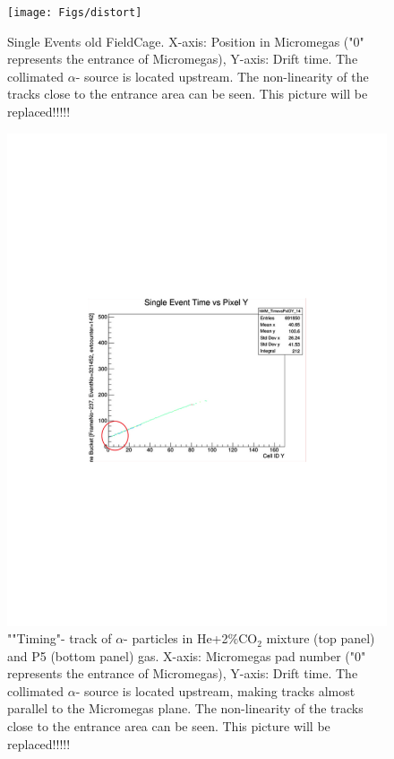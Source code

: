 \documentclass[final,number,sort&compress,5p,times,twocolumn]{elsarticle}
\begin{document}
\begin{figure}[hbt!]
    \centering
    \texttt{[image: Figs/distort]}
    \caption{Single Events old  FieldCage.   X-axis:  Position in Micromegas ("0" represents the entrance of Micromegas), Y-axis:  Drift time. The collimated $\alpha$- source is located upstream. 
    The non-linearity of the tracks close to the entrance area can be seen.    This picture will be replaced!!!!!}
      \label{fig:distort} 
\end{figure}

\begin{figure}[hbt!]
  \centering
\includegraphics[width=1.0\columnwidth]{Figs/tracks}
  \caption{""Timing"- track  of $\alpha$- particles in He+2$\%$CO$_2$ mixture (top panel) and P5 (bottom panel) gas. X-axis:  Micromegas pad number  ("0" represents the entrance of Micromegas), Y-axis:  Drift time. The collimated $\alpha$- source is located upstream, making tracks almost parallel to the Micromegas plane. The non-linearity of the tracks close to the entrance area can be seen.   This picture will be replaced!!!!! }
    \label{fig:tracks} 
	\end{figure}
\end{document}
